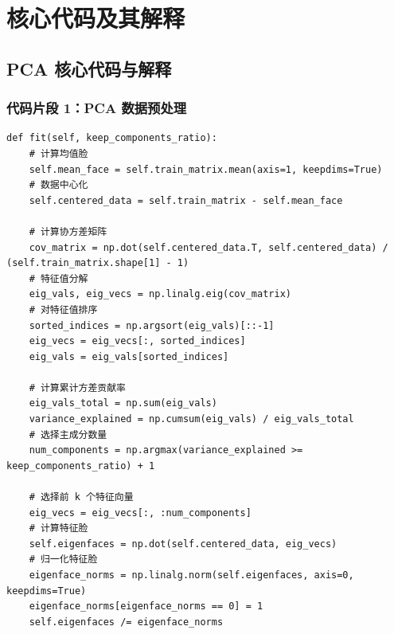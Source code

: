 \documentclass{article}
\begin{document}
\section{核心代码及其解释}

\subsection{PCA 核心代码与解释}

\subsubsection{代码片段 1：PCA 数据预处理}
\begin{lstlisting}[basicstyle=\scriptsize\ttfamily, linewidth=\textwidth]
def fit(self, keep_components_ratio):
    # 计算均值脸
    self.mean_face = self.train_matrix.mean(axis=1, keepdims=True)
    # 数据中心化
    self.centered_data = self.train_matrix - self.mean_face

    # 计算协方差矩阵
    cov_matrix = np.dot(self.centered_data.T, self.centered_data) / (self.train_matrix.shape[1] - 1)
    # 特征值分解
    eig_vals, eig_vecs = np.linalg.eig(cov_matrix)
    # 对特征值排序
    sorted_indices = np.argsort(eig_vals)[::-1]
    eig_vecs = eig_vecs[:, sorted_indices]
    eig_vals = eig_vals[sorted_indices]

    # 计算累计方差贡献率
    eig_vals_total = np.sum(eig_vals)
    variance_explained = np.cumsum(eig_vals) / eig_vals_total
    # 选择主成分数量
    num_components = np.argmax(variance_explained >= keep_components_ratio) + 1

    # 选择前 k 个特征向量
    eig_vecs = eig_vecs[:, :num_components]
    # 计算特征脸
    self.eigenfaces = np.dot(self.centered_data, eig_vecs)
    # 归一化特征脸
    eigenface_norms = np.linalg.norm(self.eigenfaces, axis=0, keepdims=True)
    eigenface_norms[eigenface_norms == 0] = 1
    self.eigenfaces /= eigenface_norms
\end{lstlisting}
\end{document}
